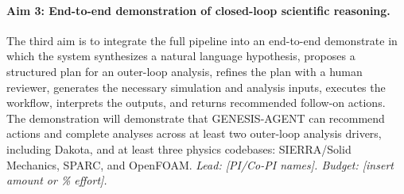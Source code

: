 \documentclass[11pt]{article} \usepackage[margin=1in]{geometry}
\begin{document}

\paragraph{Aim 3: End-to-end demonstration of closed-loop scientific reasoning.} The third aim is to integrate the full pipeline into an end-to-end demonstrate in which the system synthesizes a natural language hypothesis, proposes a structured plan for an outer-loop
analysis, refines the plan with a human reviewer, generates the necessary simulation and analysis inputs, executes
the workflow, interprets the outputs, and returns recommended follow-on actions. The demonstration will demonstrate that GENESIS-AGENT can recommend actions and complete analyses across at least two outer-loop analysis drivers, including Dakota, and at least three physics codebases: SIERRA/Solid Mechanics, SPARC, and OpenFOAM. \textit{Lead: [PI/Co-PI names]. Budget:
[insert amount or \% effort].}
\end{document}
